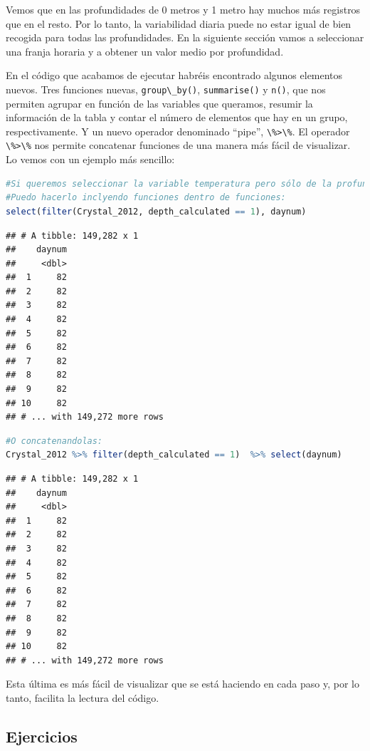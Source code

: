 \documentclass[
]{book}
\newcommand{\passthrough}[1]{#1}
\begin{document}
Vemos que en las profundidades de 0 metros y 1 metro hay muchos más registros que en el resto. Por lo tanto, la variabilidad diaria puede no estar igual de bien recogida para todas las profundidades. En la siguiente sección vamos a seleccionar una franja horaria y a obtener un valor medio por profundidad.

En el código que acabamos de ejecutar habréis encontrado algunos elementos nuevos. Tres funciones nuevas, \passthrough{\lstinline!group\_by()!}, \passthrough{\lstinline!summarise()!} y \passthrough{\lstinline!n()!}, que nos permiten agrupar en función de las variables que queramos, resumir la información de la tabla y contar el número de elementos que hay en un grupo, respectivamente. Y un nuevo operador denominado ``pipe'', \passthrough{\lstinline!\%>\%!}. El operador \passthrough{\lstinline!\%>\%!} nos permite concatenar funciones de una manera más fácil de visualizar. Lo vemos con un ejemplo más sencillo:

\begin{lstlisting}[language=R]
#Si queremos seleccionar la variable temperatura pero sólo de la profundidad de 1 metro
#Puedo hacerlo inclyendo funciones dentro de funciones:
select(filter(Crystal_2012, depth_calculated == 1), daynum)
\end{lstlisting}

\begin{lstlisting}
## # A tibble: 149,282 x 1
##    daynum
##     <dbl>
##  1     82
##  2     82
##  3     82
##  4     82
##  5     82
##  6     82
##  7     82
##  8     82
##  9     82
## 10     82
## # ... with 149,272 more rows
\end{lstlisting}

\begin{lstlisting}[language=R]
#O concatenandolas:
Crystal_2012 %>% filter(depth_calculated == 1)  %>% select(daynum)
\end{lstlisting}

\begin{lstlisting}
## # A tibble: 149,282 x 1
##    daynum
##     <dbl>
##  1     82
##  2     82
##  3     82
##  4     82
##  5     82
##  6     82
##  7     82
##  8     82
##  9     82
## 10     82
## # ... with 149,272 more rows
\end{lstlisting}

Esta última es más fácil de visualizar que se está haciendo en cada paso y, por lo tanto, facilita la lectura del código.

\hypertarget{ejercicios-2}{%
\subsection{Ejercicios}\label{ejercicios-2}}
\end{document}
